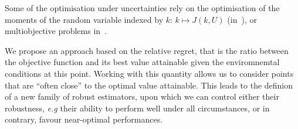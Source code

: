 \message{ !name(MascotNumTemplate.tex)}\documentclass{MascotNumAbstract}
\begin{document}
Some of the optimisation under uncertainties rely on the optimisation of the moments of the random variable indexed by $k$: $k \mapsto J(k,U)$ (in~\cite{lehman_designing_2004,janusevskis_simultaneous_2010}), or multiobjective problems in~\cite{baudoui_optimisation_2012,ribaud_krigeage_2018}.

We propose an approach based on the relative regret, that is the ratio between the objective function and its best value attainable given the enviromnemtal conditions at this point. Working with this quantity allows us to consider points that are ``often close'' to the optimal value attainable.
This leads to the definion of a new family of robust estimators, upon which we can control either their robustness, \emph{e.g} their ability to perform well under all circumstances, or in contrary, favour near-optimal performances.


 




\end{document}
